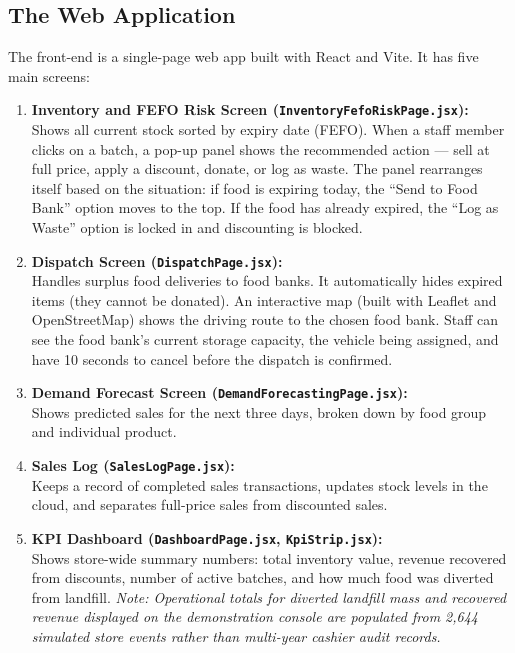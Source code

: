 \documentclass[12pt,a4paper]{article}
\renewcommand{\_}{\oldunderscore\allowbreak}
\begin{document}
\subsection{The Web Application}
The front-end is a single-page web app built with React and Vite. It has five main screens:
\begin{enumerate}[leftmargin=18pt, itemsep=3pt]
    \item \textbf{Inventory and FEFO Risk Screen (\texttt{InventoryFefoRiskPage.jsx}):}\\
    Shows all current stock sorted by expiry date (FEFO). When a staff member clicks on a batch, a pop-up panel shows the recommended action --- sell at full price, apply a discount, donate, or log as waste. The panel rearranges itself based on the situation: if food is expiring today, the ``Send to Food Bank'' option moves to the top. If the food has already expired, the ``Log as Waste'' option is locked in and discounting is blocked.

    \item \textbf{Dispatch Screen (\texttt{DispatchPage.jsx}):}\\
    Handles surplus food deliveries to food banks. It automatically hides expired items (they cannot be donated). An interactive map (built with Leaflet and OpenStreetMap) shows the driving route to the chosen food bank. Staff can see the food bank's current storage capacity, the vehicle being assigned, and have 10 seconds to cancel before the dispatch is confirmed.

    \item \textbf{Demand Forecast Screen (\texttt{DemandForecastingPage.jsx}):}\\
    Shows predicted sales for the next three days, broken down by food group and individual product.

    \item \textbf{Sales Log (\texttt{SalesLogPage.jsx}):}\\
    Keeps a record of completed sales transactions, updates stock levels in the cloud, and separates full-price sales from discounted sales.

    \item \textbf{KPI Dashboard (\texttt{DashboardPage.jsx}, \texttt{KpiStrip.jsx}):}\\
    Shows store-wide summary numbers: total inventory value, revenue recovered from discounts, number of active batches, and how much food was diverted from landfill. \emph{Note: Operational totals for diverted landfill mass and recovered revenue displayed on the demonstration console are populated from 2,644 simulated store events rather than multi-year cashier audit records.}
\end{enumerate}
\end{document}
